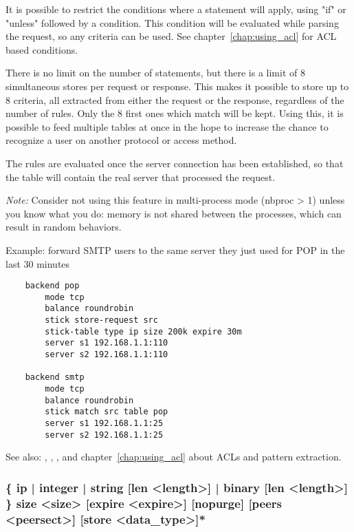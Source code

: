   It is possible to restrict the conditions where a 
  statement will apply, using "if" or "unless" followed by a condition. This
  condition will be evaluated while parsing the request, so any criteria can be
  used. See chapter~\ref{chap:using_acl} for ACL based conditions.

  There is no limit on the number of  statements, but
  there is a limit of 8 simultaneous stores per request or response. This
  makes it possible to store up to 8 criteria, all extracted from either the
  request or the response, regardless of the number of rules. Only the 8 first
  ones which match will be kept. Using this, it is possible to feed multiple
  tables at once in the hope to increase the chance to recognize a user on
  another protocol or access method.

  The  rules are evaluated once the server connection has been
  established, so that the table will contain the real server that processed
  the request.

  \emph{Note:} Consider not using this feature in multi-process mode (nbproc > 1)
         unless you know what you do: memory is not shared between the
         processes, which can result in random behaviors.

  Example: forward SMTP users to the same server they just used for POP in the last 30 minutes
  \begin{verbatim}
    backend pop
        mode tcp
        balance roundrobin
        stick store-request src
        stick-table type ip size 200k expire 30m
        server s1 192.168.1.1:110
        server s2 192.168.1.1:110

    backend smtp
        mode tcp
        balance roundrobin
        stick match src table pop
        server s1 192.168.1.1:25
        server s2 192.168.1.1:25
   \end{verbatim}


See also: , , ,  and chapter~\ref{chap:using_acl}
             about ACLs and pattern extraction.

\subsubsection[stick-table type]{ \{ ip | integer | string [len <length>] | binary [len <length>] \} size <size> [expire <expire>] [nopurge] [peers <peersect>] [store <data\_type>]*}

